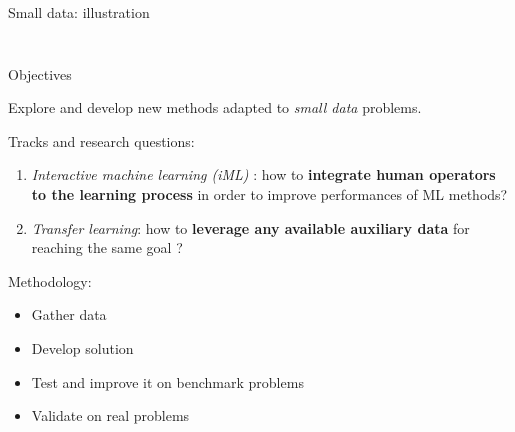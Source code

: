 \documentclass{beamer}
\begin{document}
\begin{frame}{Small data: illustration}
\begin{columns}
\begin{column}{0.5\textwidth}
\begin{figure}[!h]
		\end{figure}
\end{column}
\end{columns}
\end{frame}

\begin{frame}{Objectives}
	\begin{center}
		\large
		Explore and develop new methods adapted to \textit{small data} problems.
	\end{center}
	
	\vfill
	Tracks and research questions: 
	\begin{enumerate}
		\item \textit{Interactive machine learning (iML)} : how to \textbf{integrate human operators to the learning process} in order to improve performances of ML methods?
		\item \textit{Transfer learning}: how to \textbf{leverage any available auxiliary data} for reaching the same goal ? 
	\end{enumerate}

	\vfill
	Methodology:
	\begin{itemize}
		\item Gather data 
		\item Develop solution 
		\item Test and improve it on benchmark problems 
		\item Validate on real problems 
	\end{itemize}
\end{frame}
 
\end{document}
